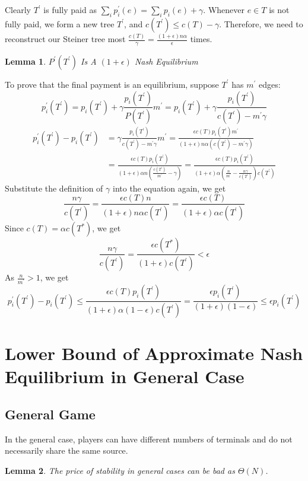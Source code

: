 \documentclass[11pt,psfig,times]{article}
\newtheorem{lemma}{Lemma}[section]
\begin{document}
		Clearly $T^{'}$ is fully paid as $\sum_i p_i^{'}(e) = \sum_i p_i(e) + \gamma$. Whenever \( e \in T \) is not fully paid, we form a new tree $T^{'}$, and $c(T^{'}) \leq c(T) - \gamma $. Therefore, we need to reconstruct our Steiner tree most  $\frac{c(T)}{\gamma} = \frac{(1+\epsilon)n\alpha }{\epsilon}$ times.

		\begin{lemma}
			$P^{'}(T^{'})$ Is A $(1+\epsilon)$ Nash Equilibrium
		\end{lemma}
		To prove that the final payment is an equilibrium, suppose $T^{'}$ has $m^{'}$ edges:
		\[p_i^{'}(T^{'}) = p_i(T^{'}) + \gamma\frac{p_i(T^{'})}{P(T^{'})}m^{'} = p_i(T^{'}) + \gamma\frac{p_i(T^{'})}{c(T^{'}) - m^{'}\gamma}\]
		\begin{align*}
		p_i^{'}(T^{'}) - p_i(T^{'}) &=  \gamma\frac{p_i(T^{'})}{c(T^{'}) - m^{'}\gamma}m^{'} = \frac{\epsilon c(T) p_i(T^{'}) m^{'} }{(1+\epsilon)n\alpha(c(T^{'}) - m^{'}\gamma)}  \\ &=  \frac{\epsilon c(T) p_i(T^{'})}{(1+\epsilon)\alpha n(\frac{c(T^{'})}{m^{'}} - \gamma)} =  \frac{\epsilon c(T) p_i(T^{'})}{(1+\epsilon)\alpha (\frac{n}{m^{'}} - \frac{n\gamma}{c(T^{'})})c(T^{'})}   
		\end{align*}
		Substitute the definition of $\gamma$ into the equation again, we get
		\[\frac{n\gamma}{c(T^{'})} = \frac{\epsilon c(T) n}{(1+\epsilon)n\alpha c(T^{'})} = \frac{\epsilon c(T) }{(1+\epsilon)\alpha c(T^{'})}\]
		Since $c(T) = \alpha c(T^*)$, we get \[ \frac{n\gamma}{c(T^{'})} = \frac{\epsilon c(T^*)}{(1+\epsilon)c(T^{'})} < \epsilon\]
		As $\frac{n}{m^{'}} > 1$, we get
		\[p_i^{'}(T^{'}) - p_i(T^{'}) \leq \frac{\epsilon c(T) p_i(T^{'}) }{(1+\epsilon)\alpha (1-\epsilon) c(T^{'}) } = \frac{\epsilon  p_i(T^{'}) }{(1+\epsilon) (1-\epsilon) } \leq \epsilon p_i(T^{'})\]
	
		
\section{Lower Bound of Approximate Nash Equilibrium in General Case}
	
\subsection{General Game}
In the general case, players can have different numbers of terminals and do not necessarily share the same source.

\begin{lemma}
	The price of stability in general cases can be bad as $\Theta(N)$.
\end{lemma}
\end{document}
